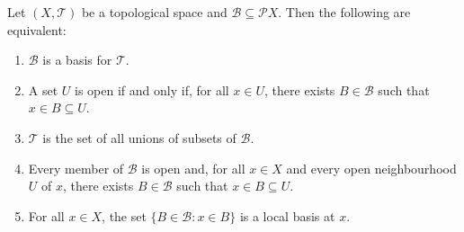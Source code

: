 \begin{prop}
  \label{prop:topology:basis:open}
  Let $(X, \mathcal{T})$ be a topological space and $\mathcal{B} \subseteq
  \mathcal{P} X$. Then the following are equivalent:
  \begin{enumerate}
    \item $\mathcal{B}$ is a basis for $\mathcal{T}$.
    \item A set $U$ is open if and only if, for all $x \in U$, there exists
    $B \in \mathcal{B}$ such that $x \in B \subseteq U$.
    \item $\mathcal{T}$ is the set of all unions of subsets of $\mathcal{B}$.
    \item Every member of $\mathcal{B}$ is open and, for all $x \in X$
    and every open neighbourhood $U$ of $x$, there exists $B \in \mathcal{B}$
    such that $x \in B \subseteq U$.
    \item For all $x \in X$, the set $\{ B \in \mathcal{B} : x \in B \}$ is a
    local basis at $x$.
  \end{enumerate}
\end{prop}

